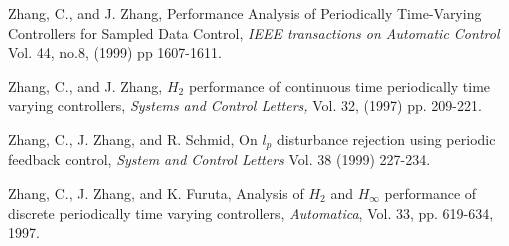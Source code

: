 \begin{thebibliography}{99}


Zhang, C., and J. Zhang, Performance Analysis of Periodically Time-Varying
Controllers for Sampled Data Control,
{\em IEEE transactions on  Automatic Control } Vol. 44, no.8,  (1999)
pp 1607-1611.

Zhang, C., and J. Zhang, $H_2$ performance of continuous time periodically  time
varying controllers, {\it Systems and Control Letters,} Vol. 32, (1997) pp. 209-221.

Zhang, C., J. Zhang, and  R. Schmid,  On $l_p$ disturbance rejection using
periodic feedback  control, {\em System  and Control Letters } Vol. 38 (1999)
227-234.

Zhang, C., J. Zhang, and K. Furuta, Analysis of $H_2$ and
$H_\infty$ performance of discrete periodically time varying controllers,
{\em Automatica}, Vol. 33, pp. 619-634, 1997.

\end{thebibliography}

